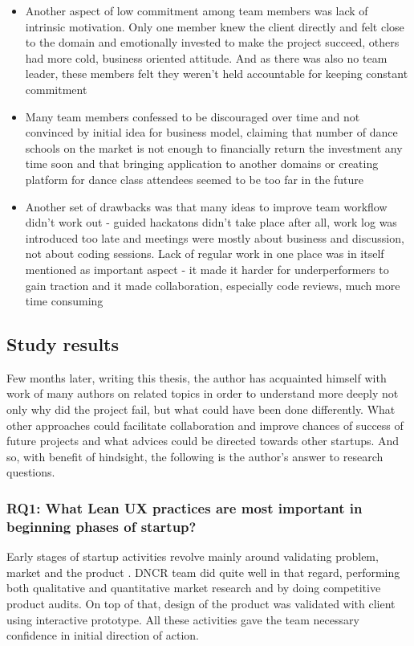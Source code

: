 \documentclass{article}
\begin{document}
\begin{itemize}
\item Another aspect of low commitment among team members was lack of intrinsic motivation. Only one member knew the client directly and felt close to the domain and emotionally invested to make the project succeed, others had more cold, business oriented attitude. And as there was also no team leader, these members felt they weren't held accountable for keeping constant commitment
\item Many team members confessed to be discouraged over time and not convinced by initial idea for business model, claiming that number of dance schools on the market is not enough to financially return the investment any time soon and that bringing application to another domains or creating platform for dance class attendees seemed to be too far in the future
\item Another set of drawbacks was that many ideas to improve team workflow didn't work out - guided hackatons didn't take place after all, work log was introduced too late and meetings were mostly about business and discussion, not about coding sessions. Lack of regular work in one place was in itself mentioned as important aspect - it made it harder for underperformers to gain traction and it made collaboration, especially code reviews, much more time consuming
\end{itemize}

\subsection{Study results}
\label{sec:research-questions}
Few months later, writing this thesis, the author has acquainted himself with work of many authors on related topics in order to understand more deeply not only why did the project fail, but what could have been done differently. What other approaches could facilitate collaboration and improve chances of success of future projects and what advices could be directed towards other startups. And so, with benefit of hindsight, the following is the author's answer to research questions.


\subsubsection{RQ1: What Lean UX practices are most important in beginning phases of startup?}
Early stages of startup activities revolve mainly around validating problem, market and the product \cite{klein2013ux}. DNCR team did quite well in that regard, performing both qualitative and quantitative market research and by doing competitive product audits. On top of that, design of the product was validated with client using interactive prototype. All these activities gave the team necessary confidence in initial direction of action.
\end{document}
